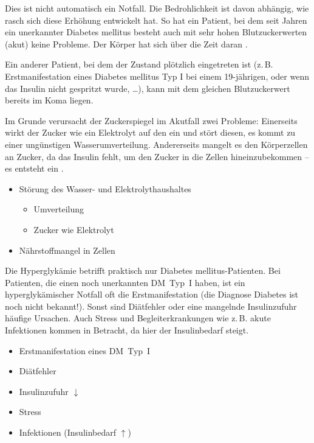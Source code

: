 {%
Dies ist nicht automatisch
ein Notfall. Die Bedrohlichkeit ist davon
abhängig, wie rasch sich diese Erhöhung entwickelt hat. So
hat ein Patient, bei dem seit Jahren ein unerkannter
Diabetes mellitus besteht auch mit sehr hohen
Blutzuckerwerten (akut) keine Probleme. Der Körper hat sich
über die Zeit daran .

Ein anderer Patient, bei dem der Zustand plötzlich
eingetreten ist (z.\,B. Erstmanifestation eines Diabetes
mellitus Typ I bei einem 19-jährigen, oder wenn das Insulin
nicht gespritzt wurde, \ldots), kann mit dem gleichen
Blutzuckerwert bereits im Koma liegen.
}
{}
{}{}{}

\begin{Synopsis}
\end{Synopsis}

{
Im Grunde verursacht der Zuckerspiegel im Akutfall zwei
Probleme: Einerseits wirkt der Zucker wie ein Elektrolyt auf
den  ein und stört diesen, es kommt
zu einer ungünstigen Wasserumverteilung. Andererseits
mangelt es den Körperzellen an Zucker, da das Insulin fehlt,
um den Zucker in die Zellen hineinzubekommen -- es entsteht ein
.
}{
\begin{itemize}
  \item Störung des Wasser- und Elektrolythaushaltes
  \begin{itemize}
    \item Umverteilung
    \item Zucker wie Elektrolyt
  \end{itemize}
  \item Nährstoffmangel in Zellen
\end{itemize}
}{}{}{}


{%
Die Hyperglykämie betrifft praktisch nur Diabetes mellitus-Patienten. Bei
Patienten, die einen noch unerkannten DM~Typ~I haben, ist
ein hyperglykämischer Notfall oft die Erstmanifestation (die
Diagnose Diabetes ist noch nicht bekannt!). Sonst sind
Diätfehler oder eine mangelnde Insulinzufuhr häufige
Ursachen. Auch Stress und Begleiterkrankungen wie z.\,B.
akute Infektionen kommen in Betracht, da hier der
Insulinbedarf steigt.
}{
\begin{itemize}
  \item Erstmanifestation eines DM~Typ~I
  \item Diätfehler
  \item Insulinzufuhr $\downarrow$
  \item Stress
  \item Infektionen (Insulinbedarf ${\uparrow}$)
\end{itemize}
}{}{}{}









